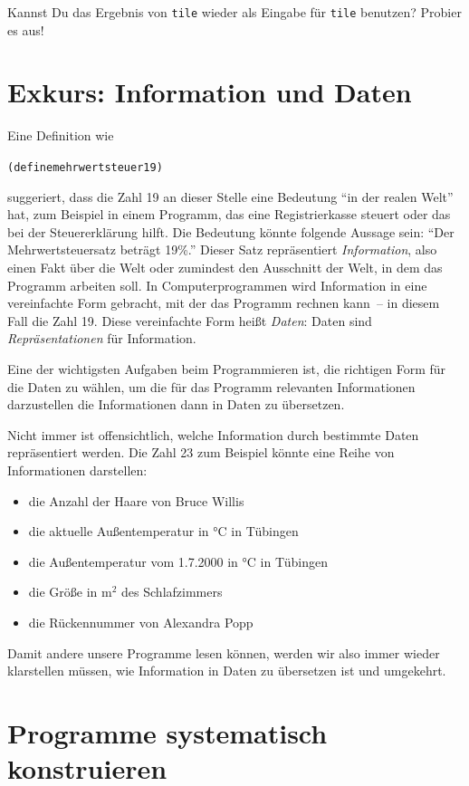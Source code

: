 \begin{aufgabe}
  Kannst Du das Ergebnis von \texttt{tile} wieder als Eingabe für
  \texttt{tile} benutzen?  Probier es aus!
\end{aufgabe}

\section{Exkurs: Information und Daten}

Eine Definition wie
%
\begin{alltt}
(define mehrwertsteuer 19)
\end{alltt}
%
suggeriert, dass die Zahl 19 an dieser Stelle eine Bedeutung "`in der
realen Welt"' hat, zum Beispiel in einem Programm, das eine Registrierkasse
steuert oder das bei der Steuererklärung hilft.  Die Bedeutung könnte
folgende Aussage sein: "`Der Mehrwertsteuersatz beträgt 19\%."'
Dieser Satz repräsentiert \textit{Information},
also einen Fakt über die Welt oder zumindest den Ausschnitt der Welt, in
dem das Programm arbeiten soll.  In Computerprogrammen wird
Information in eine vereinfachte Form gebracht, mit der das Programm
rechnen kann~-- in diesem Fall die Zahl 19.  Diese vereinfachte Form
heißt \textit{Daten}: Daten sind
\textit{Repräsentationen} für Information.

Eine der wichtigsten Aufgaben beim Programmieren ist, die richtigen
Form für die Daten zu wählen, um die für das Programm relevanten
Informationen darzustellen die Informationen dann in Daten zu
übersetzen.

Nicht immer ist offensichtlich, welche Information durch bestimmte
Daten repräsentiert werden.  Die Zahl 23 zum Beispiel könnte eine Reihe
von Informationen darstellen:
%
\begin{itemize}
\item die Anzahl der Haare von Bruce Willis
\item die aktuelle Außentemperatur in °C in Tübingen
\item die Außentemperatur vom 1.7.2000 in °C in Tübingen
\item die Größe in m$^2$ des Schlafzimmers
\item die Rückennummer von Alexandra Popp
\end{itemize}
%
Damit andere unsere Programme lesen können, werden wir also immer
wieder klarstellen müssen, wie Information in Daten zu übersetzen ist
und umgekehrt.

\section{Programme systematisch konstruieren}


